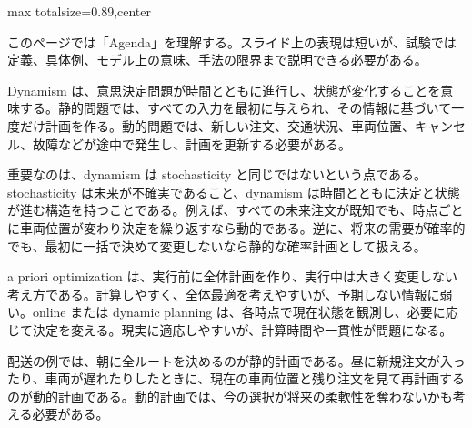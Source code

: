 \begin{minipage}[t]{0.58\textwidth}
\begin{adjustbox}{max totalsize={\textwidth}{0.89\textheight},center}
\begin{minipage}{\textwidth}\scriptsize
{}このページでは「Agenda」を理解する。スライド上の表現は短いが、試験では定義、具体例、モデル上の意味、手法の限界まで説明できる必要がある。\par
Dynamism は、意思決定問題が時間とともに進行し、状態が変化することを意味する。静的問題では、すべての入力を最初に与えられ、その情報に基づいて一度だけ計画を作る。動的問題では、新しい注文、交通状況、車両位置、キャンセル、故障などが途中で発生し、計画を更新する必要がある。\par
重要なのは、dynamism は stochasticity と同じではないという点である。stochasticity は未来が不確実であること、dynamism は時間とともに決定と状態が進む構造を持つことである。例えば、すべての未来注文が既知でも、時点ごとに車両位置が変わり決定を繰り返すなら動的である。逆に、将来の需要が確率的でも、最初に一括で決めて変更しないなら静的な確率計画として扱える。\par
a priori optimization は、実行前に全体計画を作り、実行中は大きく変更しない考え方である。計算しやすく、全体最適を考えやすいが、予期しない情報に弱い。online または dynamic planning は、各時点で現在状態を観測し、必要に応じて決定を変える。現実に適応しやすいが、計算時間や一貫性が問題になる。\par
配送の例では、朝に全ルートを決めるのが静的計画である。昼に新規注文が入ったり、車両が遅れたりしたときに、現在の車両位置と残り注文を見て再計画するのが動的計画である。動的計画では、今の選択が将来の柔軟性を奪わないかも考える必要がある。\par

\end{minipage}
\end{adjustbox}
\end{minipage}
